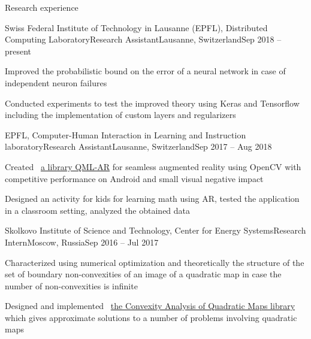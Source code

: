 \documentclass{resume} %
\begin{document}
\begin{rSection}{Research experience}

	\begin{rSubsection}{Swiss Federal Institute of Technology in Lausanne (EPFL), Distributed Computing Laboratory}{Research Assistant}{Lausanne, Switzerland}{Sep 2018 -- present}
		\item Improved the probabilistic bound on the error of a neural network in case of independent neuron failures
		\item Conducted experiments to test the improved theory using Keras and Tensorflow including the implementation of custom layers and regularizers
	\end{rSubsection}

	\begin{rSubsection}{EPFL, Computer-Human Interaction in Learning and Instruction laboratory}{Research Assistant}{Lausanne, Switzerland}{Sep 2017 -- Aug 2018}
		\item Created \faExternalLink~\href{https://github.com/chili-epfl/qml-ar}{a library QML-AR} for seamless augmented reality using OpenCV with competitive performance on Android and small visual negative impact
		\item Designed an activity for kids for learning math using AR, tested the application in a classroom setting, analyzed the obtained data
	\end{rSubsection}
	
	\begin{rSubsection}{Skolkovo Institute of Science and Technology, Center for Energy Systems}{Research Intern}{Moscow, Russia}{Sep 2016 -- Jul 2017}
		\item Characterized using numerical optimization and theoretically the structure of the set of boundary non-convexities of an image of a quadratic map in case the number of non-convexities is infinite
		\item Designed and implemented \faExternalLink~\href{https://github.com/sergeivolodin/CAQM}{the Convexity Analysis of Quadratic Maps library} which gives approximate solutions to a number of problems involving quadratic maps
	\end{rSubsection}
	
	

\end{rSection}
\end{document}
